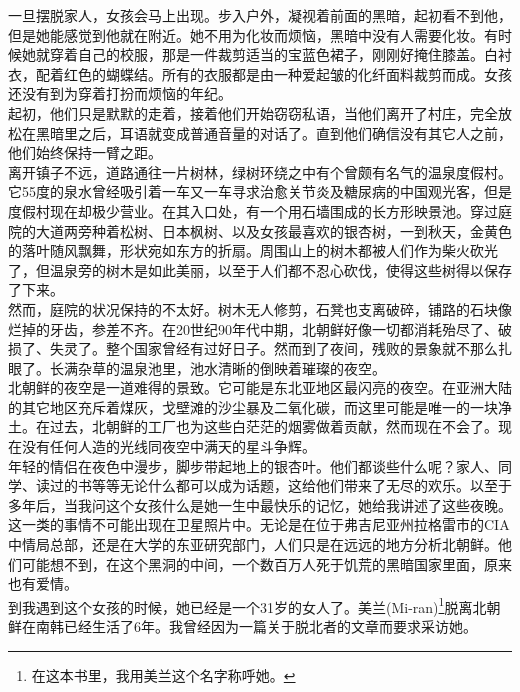 一旦摆脱家人，女孩会马上出现。步入户外，凝视着前面的黑暗，起初看不到他，但是她能感觉到他就在附近。她不用为化妆而烦恼，黑暗中没有人需要化妆。有时候她就穿着自己的校服，那是一件裁剪适当的宝蓝色裙子，刚刚好掩住膝盖。白衬衣，配着红色的蝴蝶结。所有的衣服都是由一种爱起皱的化纤面料裁剪而成。女孩还没有到为穿着打扮而烦恼的年纪。\\

起初，他们只是默默的走着，接着他们开始窃窃私语，当他们离开了村庄，完全放松在黑暗里之后，耳语就变成普通音量的对话了。直到他们确信没有其它人之前，他们始终保持一臂之距。\\

离开镇子不远，道路通往一片树林，绿树环绕之中有个曾颇有名气的温泉度假村。它55度的泉水曾经吸引着一车又一车寻求治愈关节炎及糖尿病的中国观光客，但是度假村现在却极少营业。在其入口处，有一个用石墙围成的长方形映景池。穿过庭院的大道两旁种着松树、日本枫树、以及女孩最喜欢的银杏树，一到秋天，金黄色的落叶随风飘舞，形状宛如东方的折扇。周围山上的树木都被人们作为柴火砍光了，但温泉旁的树木是如此美丽，以至于人们都不忍心砍伐，使得这些树得以保存了下来。\\

然而，庭院的状况保持的不太好。树木无人修剪，石凳也支离破碎，铺路的石块像烂掉的牙齿，参差不齐。在20世纪90年代中期，北朝鲜好像一切都消耗殆尽了、破损了、失灵了。整个国家曾经有过好日子。然而到了夜间，残败的景象就不那么扎眼了。长满杂草的温泉池里，池水清晰的倒映着璀璨的夜空。\\

北朝鲜的夜空是一道难得的景致。它可能是东北亚地区最闪亮的夜空。在亚洲大陆的其它地区充斥着煤灰，戈壁滩的沙尘暴及二氧化碳，而这里可能是唯一的一块净土。在过去，北朝鲜的工厂也为这些白茫茫的烟雾做着贡献，然而现在不会了。现在没有任何人造的光线同夜空中满天的星斗争辉。\\

年轻的情侣在夜色中漫步，脚步带起地上的银杏叶。他们都谈些什么呢？家人、同学、读过的书等等无论什么都可以成为话题，这给他们带来了无尽的欢乐。以至于多年后，当我问这个女孩什么是她一生中最快乐的记忆，她给我讲述了这些夜晚。\\

这一类的事情不可能出现在卫星照片中。无论是在位于弗吉尼亚州拉格雷市的CIA中情局总部，还是在大学的东亚研究部门，人们只是在远远的地方分析北朝鲜。他们可能想不到，在这个黑洞的中间，一个数百万人死于饥荒的黑暗国家里面，原来也有爱情。\\

到我遇到这个女孩的时候，她已经是一个31岁的女人了。美兰(Mi-ran)\footnote{在这本书里，我用美兰这个名字称呼她。}脱离北朝鲜在南韩已经生活了6年。我曾经因为一篇关于脱北者的文章而要求采访她。\\

